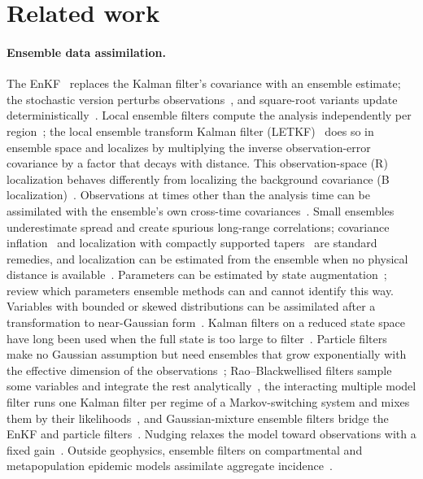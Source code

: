 \documentclass[10pt]{article}
\theoremstyle{remark}
\begin{document}
\section{Related work}
\label{sec:related}

\paragraph{Ensemble data assimilation.} The EnKF~\cite{evensen1994,evensen2003} replaces the Kalman filter's covariance with an ensemble estimate; the stochastic version perturbs observations~\cite{burgers1998,houtekamer1998}, and square-root variants update deterministically~\cite{anderson2001,bishop2001}. Local ensemble filters compute the analysis independently per region~\cite{ott2004}; the local ensemble transform Kalman filter (LETKF)~\cite{hunt2007} does so in ensemble space and localizes by multiplying the inverse observation-error covariance by a factor that decays with distance. This observation-space (R) localization behaves differently from localizing the background covariance (B localization)~\cite{greybush2011}. Observations at times other than the analysis time can be assimilated with the ensemble's own cross-time covariances~\cite{hunt2004}. Small ensembles underestimate spread and create spurious long-range correlations; covariance inflation~\cite{anderson1999,whitaker2012} and localization with compactly supported tapers~\cite{gaspari1999} are standard remedies, and localization can be estimated from the ensemble when no physical distance is available~\cite{andersonlei2013}. Parameters can be estimated by state augmentation~\cite{evensen2009}; \citet{ruiz2013} review which parameters ensemble methods can and cannot identify this way. Variables with bounded or skewed distributions can be assimilated after a transformation to near-Gaussian form~\cite{bertino2003}. Kalman filters on a reduced state space have long been used when the full state is too large to filter~\cite{cane1996}. Particle filters~\cite{gordon1993} make no Gaussian assumption but need ensembles that grow exponentially with the effective dimension of the observations~\cite{snyder2008,vanleeuwen2019}; Rao--Blackwellised filters sample some variables and integrate the rest analytically~\cite{doucet2000}, the interacting multiple model filter runs one Kalman filter per regime of a Markov-switching system and mixes them by their likelihoods~\cite{blom1988}, and Gaussian-mixture ensemble filters bridge the EnKF and particle filters~\cite{stordal2011}. Nudging relaxes the model toward observations with a fixed gain~\cite{hoke1976}. Outside geophysics, ensemble filters on compartmental and metapopulation epidemic models assimilate aggregate incidence~\cite{shaman2012,pei2018}.
\end{document}
